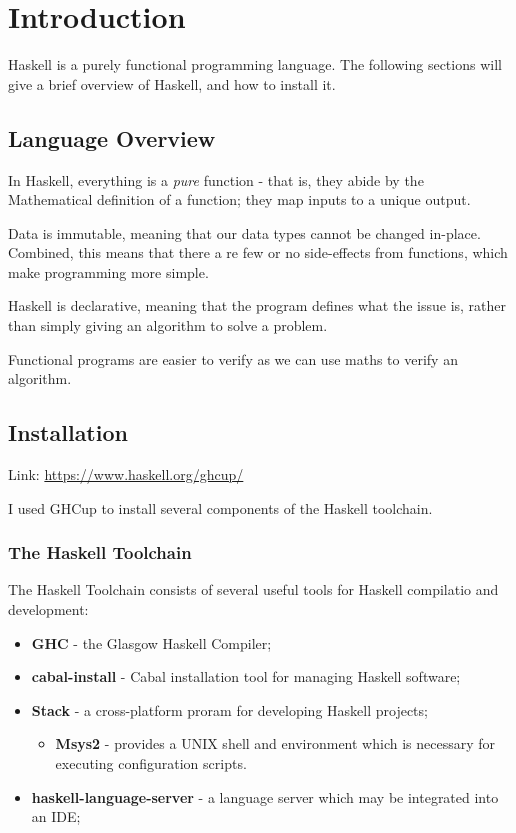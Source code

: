 \section{Introduction}
\label{sec:introduction}
Haskell is a purely functional programming language. The following sections will give a brief overview of Haskell, and how to install it.

\subsection{Language Overview}
In Haskell, everything is a \textit{pure} function - that is, they abide by the Mathematical definition of a function; they map inputs to a unique output.

Data is immutable, meaning that our data types cannot be changed in-place. Combined, this means that there a re few or no side-effects from functions, which make programming more simple.

Haskell is declarative, meaning that the program defines what the issue is, rather than simply giving an algorithm to solve a problem.

Functional programs are easier to verify as we can use maths to verify an algorithm.

\subsection{Installation}
Link: \url{https://www.haskell.org/ghcup/}

I used GHCup to install several components of the Haskell toolchain.

\subsubsection{The Haskell Toolchain}
The Haskell Toolchain consists of several useful tools for Haskell compilatio and development:

\begin{itemize}
  \item \textbf{GHC} - the Glasgow Haskell Compiler;
  \item \textbf{cabal-install} - Cabal installation tool for managing Haskell software;
  \item \textbf{Stack} - a cross-platform proram for developing Haskell projects;
  \begin{itemize}
    \item \textbf{Msys2} - provides a UNIX shell and environment which is necessary for executing configuration scripts.
  \end{itemize}
  \item \textbf{haskell-language-server} - a language server which may be integrated into an IDE;
\end{itemize}

